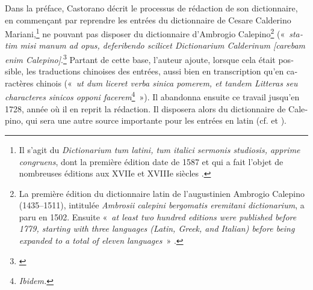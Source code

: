 \documentclass[output=paper,colorlinks,citecolor=brown,arabicfont,chinesefont,booklanguage=french]{langscibook}
\begin{document}
\begin{otherlanguage}{french}
Dans la préface, Castorano décrit le processus de rédaction de son dictionnaire, en commençant par reprendre les entrées du dictionnaire de Cesare Calderino Mariani,\footnote{Il s’agit du \emph{Dictionarium tum latini, tum italici sermonis studiosis, apprime congruens}, dont la première édition date de 1587 et qui a fait l’objet de nombreuses éditions aux XVIIe et XVIIIe siècles \citet[178]{Li2017}.} ne pouvant pas disposer du dictionnaire d’Ambrogio Calepino\footnote{La première édition du dictionnaire latin de l’augustinien Ambrogio Calepino (1435–1511), intitulée \emph{Ambrosii calepini bergomatis eremitani dictionarium}, a paru en 1502. Ensuite «~\emph{at least two hundred editions were published before 1779, starting with three languages (Latin, Greek, and Italian) before being expanded to a total of eleven languages}~» \citep{Zwartjes2021}.} («~\emph{statim misi manum ad opus, deferibendo scilicet Dictionarium Calderinum [carebam enim Calepino]}.\footnote{\citet[f.4]{Orazi1732}} Partant de cette base, l’auteur ajoute, lorsque cela était possible, les traductions chinoises des entrées, aussi bien en transcription qu’en caractères chinois («~\emph{ut dum liceret verba sinica pomerem, et tandem Litteras seu characteres sinicos opponi facerem}\footnote{\emph{Ibidem.}}~»). Il abandonna ensuite ce travail jusqu’en 1728, année où il en reprit la rédaction. Il disposera alors du dictionnaire de Calepino, qui sera une autre source importante pour les entrées en latin (cf. \citealt{Li2017}  et \citealt{Castorina2019}).


\end{otherlanguage}
\end{document}

